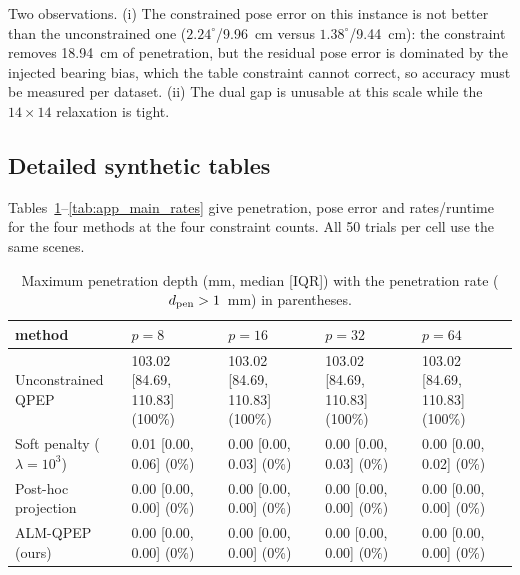 \begin{table}[t]
\end{table}

Two observations. (i) The constrained pose error on this instance is not better than the unconstrained one ($2.24^\circ$/9.96~cm versus $1.38^\circ$/9.44~cm): the constraint removes 18.94~cm of penetration, but the residual pose error is dominated by the injected bearing bias, which the table constraint cannot correct, so accuracy must be measured per dataset. (ii) The dual gap is unusable at this scale while the $14\times14$ relaxation is tight.

\subsection{Detailed synthetic tables}\label{app:synthetic}
Tables~\ref{tab:app_main_pen}--\ref{tab:app_main_rates} give penetration, pose error and rates/runtime for the four methods at the four constraint counts. All 50 trials per cell use the same scenes.

\begin{table}[t]
\centering
\caption{Maximum penetration depth (mm, median [IQR]) with the penetration rate ($d_{\rm pen}>1$~mm) in parentheses.}
\label{tab:app_main_pen}
\scriptsize
\setlength{\tabcolsep}{3pt}
\begin{tabular}{@{}l*{4}{p{3.05cm}}@{}}
\toprule
method & $p=8$ & $p=16$ & $p=32$ & $p=64$ \\
\midrule
Unconstrained QPEP & 103.02 [84.69, 110.83] (100\%) & 103.02 [84.69, 110.83] (100\%) & 103.02 [84.69, 110.83] (100\%) & 103.02 [84.69, 110.83] (100\%) \\
Soft penalty ($\lambda{=}10^3$) & 0.01 [0.00, 0.06] (0\%) & 0.00 [0.00, 0.03] (0\%) & 0.00 [0.00, 0.03] (0\%) & 0.00 [0.00, 0.02] (0\%) \\
Post-hoc projection & 0.00 [0.00, 0.00] (0\%) & 0.00 [0.00, 0.00] (0\%) & 0.00 [0.00, 0.00] (0\%) & 0.00 [0.00, 0.00] (0\%) \\
ALM-QPEP (ours) & 0.00 [0.00, 0.00] (0\%) & 0.00 [0.00, 0.00] (0\%) & 0.00 [0.00, 0.00] (0\%) & 0.00 [0.00, 0.00] (0\%) \\
\bottomrule
\end{tabular}

\end{table}

